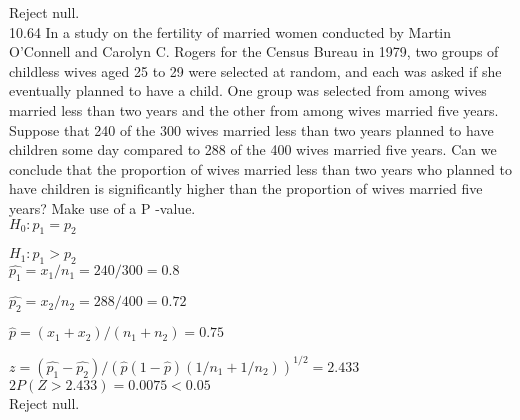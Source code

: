 Reject null. \\


10.64 In a study on the fertility of married women conducted by Martin O’Connell and Carolyn C. Rogers for the Census Bureau in 1979, two groups of childless wives aged 25 to 29 were selected at random, and each was asked if she eventually planned to have a child. One group was selected from among wives married less than two years and the other from among wives married five years. Suppose that 240 of the 300 wives married less than two years planned to have children some day compared to 288 of the 400 wives married five years. Can we conclude that the proportion of wives married less than two years who planned to have children is significantly higher than the proportion of wives married five years? Make use of a P -value. \\

$H_0 : p_1 = p_2$

$H_1 : p_1 > p_2$ \\

$\hat{p_1} = x_1/n_1 = 240/300 = 0.8$

$\hat{p_2} = x_2/n_2 = 288/400 = 0.72$

$\hat{p} = (x_1 + x_2)/(n_1 + n_2) = $$0.75$

$z = (\hat{p_1} - \hat{p_2})/(\hat{p}(1 - \hat{p})(1/n_1 + 1/n_2))^{1/2}$$=2.433$ \\

$2P(Z > 2.433) = 0.0075 < 0.05$  \\

Reject null. \\




